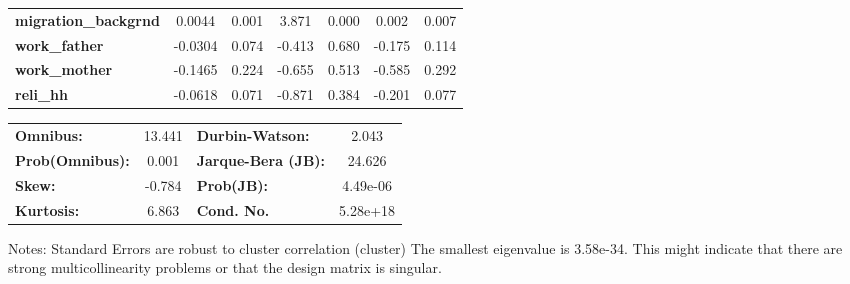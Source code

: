 \begin{center}
\begin{tabular}{lcccccc}
\textbf{migration\_backgrnd}             &       0.0044  &        0.001     &     3.871  &         0.000        &        0.002    &        0.007     \\
\textbf{work\_father}                    &      -0.0304  &        0.074     &    -0.413  &         0.680        &       -0.175    &        0.114     \\
\textbf{work\_mother}                    &      -0.1465  &        0.224     &    -0.655  &         0.513        &       -0.585    &        0.292     \\
\textbf{reli\_hh}                        &      -0.0618  &        0.071     &    -0.871  &         0.384        &       -0.201    &        0.077     \\
\bottomrule
\end{tabular}
\begin{tabular}{lclc}
\textbf{Omnibus:}       & 13.441 & \textbf{  Durbin-Watson:     } &    2.043  \\
\textbf{Prob(Omnibus):} &  0.001 & \textbf{  Jarque-Bera (JB):  } &   24.626  \\
\textbf{Skew:}          & -0.784 & \textbf{  Prob(JB):          } & 4.49e-06  \\
\textbf{Kurtosis:}      &  6.863 & \textbf{  Cond. No.          } & 5.28e+18  \\
\bottomrule
\end{tabular}
\end{center}

Notes: \newline
 [1] Standard Errors are robust to cluster correlation (cluster) \newline
 [2] The smallest eigenvalue is 3.58e-34. This might indicate that there are \newline
 strong multicollinearity problems or that the design matrix is singular.
